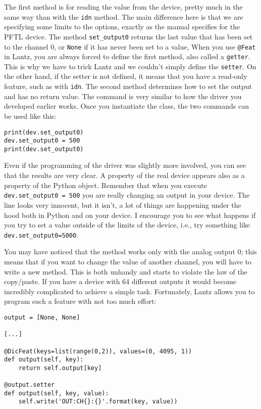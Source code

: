 The first method is for reading the value from the device, pretty much
in the same way than with the \texttt{idn} method. The main difference
here is that we are specifying some limits to the options, exactly as
the manual specifies for the {PFTL} device. The method
\texttt{set\_output0} returns the last value that has been set to the
channel 0, or \texttt{None} if it has never been set to a value, When
you use \texttt{@Feat} in Lantz, you are always forced to define the
first method, also called a \texttt{getter}. This is why we have to
trick Lantz and we couldn't simply define the \texttt{setter}. On the
other hand, if the setter is not defined, it means that you have a
read-only feature, such as with \texttt{idn}. The second method
determines how to set the output and has no return value. The command is
very similar to how the driver you developed earlier works. Once you
instantiate the class, the two commands can be used like this:

\begin{verbatim}
print(dev.set_output0)
dev.set_output0 = 500
print(dev.set_output0)
\end{verbatim}

Even if the programming of the driver was slightly more involved, you
can see that the results are very clear. A property of the real device
appears also as a property of the Python object. Remember that when you
execute \texttt{dev.set\_output0\ =\ 500} you are really changing an
output in your device. The line looks very innocent, but it isn't, a lot
of things are happening under the hood both in Python and on your
device. I encourage you to see what happens if you try to set a value
outside of the limits of the device, i.e., try something like
\texttt{dev.set\_output0=5000}.

You may have noticed that the method works only with the analog output
0; this means that if you want to change the value of another channel,
you will have to write a new method. This is both unhandy and starts to
violate the law of the copy/paste. If you have a device with 64
different outputs it would become incredibly complicated to achieve a
simple task. Fortunately, Lantz allows you to program such a feature
with not too much effort:

\begin{verbatim}
output = [None, None]

[...]

@DicFeat(keys=list(range(0,2)), values=(0, 4095, 1))
def output(self, key):
    return self.output[key]

@output.setter
def output(self, key, value):
    self.write('OUT:CH{}:{}'.format(key, value))
\end{verbatim}

